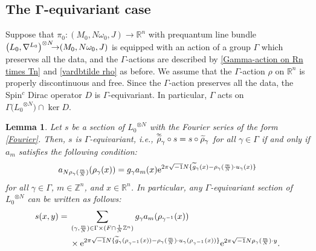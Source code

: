 \documentclass[10pt,a4paper]{amsart}
\numberwithin{equation}{section}
\newtheorem{Lemma}[Theorem]{Lemma}
\newcommand{\R}{\mathbb{R}}
\newcommand{\Z}{\mathbb{Z}}
\renewcommand{\tilde}{\widetilde}
\newcommand{\vardbtilde}[1]{\tilde{\raisebox{0pt}[0.85\height]{$\tilde{#1}$}}}
\begin{document}
\subsection[The Gamma-equivariant case]{The $\boldsymbol{\Gamma}$-equivariant case}
Suppose that $\pi_0\colon (M_0,N\omega_0,J)\to \R^n$ with prequantum line bundle $\bigl({L_0}, \nabla^{L_0}\bigr)^{\otimes N}{\hspace*{-1mm}\to} (M_0,N\omega_0,J)$ is equipped with an action of a group $\Gamma$ which preserves all the data, and the $\Gamma$-actions are described by \eqref{Gamma-action on Rn times Tn} and \eqref{vardbtilde rho} as before. We assume that the $\Gamma$-action $\rho$ on $\R^n$ is properly discontinuous and free.
Since the $\Gamma$-action preserves all the data, the Spin${}^c$ Dirac operator $D$ is $\Gamma$-equivariant. In particular, $\Gamma$ acts on $\Gamma \bigl({L_0}^{\otimes N}\bigr)\cap \ker D$.%
\begin{Lemma}\label{Gamma-invariance-lemma}
Let $s$ be a section of ${L_0}^{\otimes N}$ with the Fourier series of the form \eqref{Fourier}.
Then, $s$ is $\Gamma$-equivariant, i.e., ${\vardbtilde \rho}_\gamma\circ s=s\circ {\tilde \rho}_\gamma$ for all $\gamma\in \Gamma$ if and only if $a_m$ satisfies the following condition:
\begin{gather}\label{Gamma-invariance}
a_{N\rho_\gamma(\frac{m}{N})}(\rho_\gamma (x))=g_\gamma a_m(x){\rm e}^{2\pi\sqrt{-1}N\{ {\tilde g}_\gamma(x)
-\rho_\gamma(\frac{m}{N})\cdot u_\gamma (x)\}}
\end{gather}
for all $\gamma \in \Gamma$, $m\in \Z^n$, and $x\in \R^n$. In particular, any $\Gamma$-equivariant section of ${L_0}^{\otimes N}$ can be written as follows:
\begin{align}
s(x,y)={}&\sum_{(\gamma ,\frac{m}{N})\in \Gamma \times (F\cap \frac{1}{N}\Z^n)}g_{\gamma}a_m(\rho_{\gamma^{-1}}(x))\nonumber\\
&\times{\rm e}^{2\pi\sqrt{-1}N\{{\tilde g}_\gamma (\rho_{\gamma^{-1}}(x))-\rho_{\gamma}(\frac{m}{N})\cdot u_{\gamma}(\rho_{\gamma^{-1}}(x))\}}{\rm e}^{2\pi\sqrt{-1}N\rho_{\gamma}(\frac{m}{N})\cdot y}.\label{Gamma-equiv section}
\end{align}
\end{Lemma}
\end{document}
